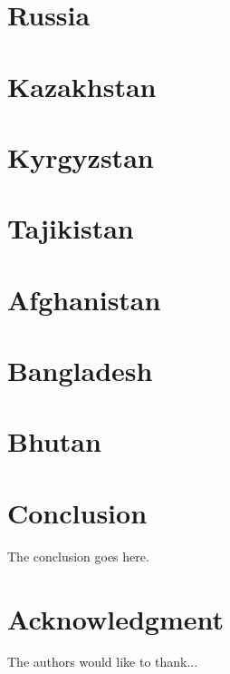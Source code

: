 \documentclass[conference]{IEEEtran}
\begin{document}
	\section{Russia}
	
	\section{Kazakhstan}
	
	\section{Kyrgyzstan}
	
	\section{Tajikistan}
	
	\section{Afghanistan}
	
	\section{Bangladesh}
	
	\section{Bhutan}
	
	\section{Conclusion}
	The conclusion goes here.
	
	\section*{Acknowledgment}
	The authors would like to thank...
	
	
	
\end{document}

